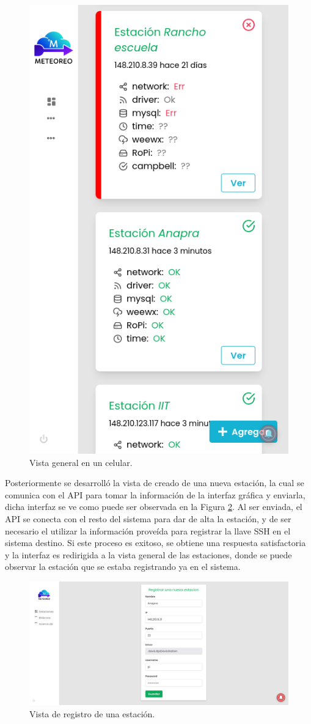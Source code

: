 \begin{figure}[!ht]
	\centering
	\includegraphics[width=0.37\linewidth]{images/screenshots/0.0.1-dashboard-responsive.png}
	\caption{Vista general en un celular.}
	\label{fig:dashboard-responsive}
\end{figure}

Posteriormente se desarrolló la vista de creado de una nueva estación, la cual se comunica con el API para tomar la información de la interfaz gráfica y enviarla, dicha interfaz se ve como puede ser observada en la Figura \ref{fig:reigster-station}. Al ser enviada, el API se conecta con el resto del sistema para dar de alta la estación, y de ser necesario el utilizar la información proveída para registrar la llave SSH en el sistema destino. Si este proceso es exitoso, se obtiene una respuesta satisfactoria y la interfaz es redirigida a la vista general de las estaciones, donde se puede observar la estación que se estaba registrando ya en el sistema.

\begin{figure}[!ht]
   \centering
   \includegraphics[width=1\linewidth]{images/screenshots/1.0.0-register_station.png}
   \caption{Vista de registro de una estación.}
   \label{fig:reigster-station}
\end{figure}

